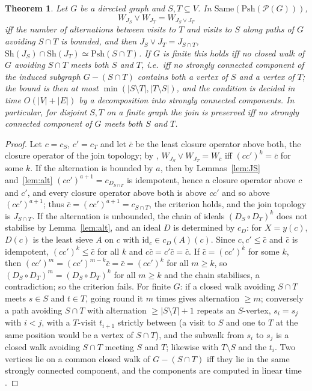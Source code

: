 \documentclass[11pt]{amsart}
\newtheorem{thm}{Theorem}[section]
\theoremstyle{definition}
\newcommand{\Same}{\mathrm{Same}}
\newcommand{\Psh}{\mathrm{Psh}}
\newcommand{\Sh}{\mathrm{Sh}}
\newcommand{\cP}{\mathcal P}
\begin{document}
\begin{thm}\label{thm:cut}
Let $G$ be a directed graph and $S,T\subseteq V$. In
$\Same(\Psh(\cP(G)))$,
\[
W_{J_S}\vee W_{J_T}=W_{J_S\vee J_T}
\]
iff the number of alternations between visits to $T$ and visits to $S$
along paths of $G$ avoiding $S\cap T$ is bounded, and then $J_S\vee
J_T=J_{S\cap T}$, $\Sh(J_S)\cap\Sh(J_T)\simeq\Psh(S\cap T)$. If $G$ is
finite this holds iff no closed walk of $G$ avoiding $S\cap T$ meets both
$S$ and $T$, i.e.\ iff no strongly connected component of the induced
subgraph $G-(S\cap T)$ contains both a vertex of $S$ and a vertex of $T$;
the bound is then at most $\min(|S\setminus T|,|T\setminus S|)$, and the
condition is decided in time $O(|V|+|E|)$ by a decomposition into strongly
connected components. In particular, for disjoint $S,T$ on a finite graph
the join is preserved iff no strongly connected component of $G$ meets both
$S$ and $T$.
\end{thm}
\begin{proof}
Let $c=c_S$, $c'=c_T$ and let $\bar c$ be the least closure operator
above both, the closure operator of the join topology; by
\cite[Thm.~B]{Fijoin}, $W_{J_S}\vee W_{J_T}=W_{\bar c}$ iff $(cc')^k=\bar c$
for some $k$. If the alternation is bounded by $a$, then by
Lemmas~\ref{lem:JS} and~\ref{lem:alt} $(cc')^{a+1}=c_{D_{S\cap T}}$ is
idempotent, hence a closure operator above $c$ and $c'$, and every closure
operator above both is above $cc'$ and so above $(cc')^{a+1}$; thus $\bar
c=(cc')^{a+1}=c_{S\cap T}$, the criterion holds, and the join topology is
$J_{S\cap T}$. If the alternation is unbounded, the chain of ideals
$(D_S\circ D_T)^k$ does not stabilise by Lemma~\ref{lem:alt}, and an ideal
$D$ is determined by $c_D$: for $X=y(c)$, $D(c)$ is the least sieve $A$ on
$c$ with $\mathrm{id}_c\in c_D(A)(c)$. Since $c,c'\le\bar c$ and $\bar c$ is
idempotent, $(cc')^k\le\bar c$ for all $k$ and $c\bar c=c'\bar c=\bar c$.
If $\bar c=(cc')^k$ for some $k$, then $(cc')^m=(cc')^{m-k}\bar c=\bar
c=(cc')^k$ for all $m\ge k$, so $(D_S\circ D_T)^m=(D_S\circ D_T)^k$ for all
$m\ge k$ and the chain stabilises, a contradiction; so the criterion fails.
For finite $G$: if a closed walk avoiding $S\cap T$ meets $s\in S$ and
$t\in T$, going round it $m$ times gives alternation $\ge m$; conversely a
path avoiding $S\cap T$ with alternation $\ge|S\setminus T|+1$ repeats an
$S$-vertex, $s_i=s_j$ with $i<j$, with a $T$-visit $t_{i+1}$ strictly
between (a visit to $S$ and one to $T$ at the same position would be a
vertex of $S\cap T$), and the subwalk from $s_i$ to $s_j$ is a closed walk
avoiding $S\cap T$ meeting $S$ and $T$; likewise with $T\setminus S$ and
the $t_i$. Two vertices lie on a common closed walk of $G-(S\cap T)$ iff
they lie in the same strongly connected component, and the components are
computed in linear time \cite{Tarjan}.
\end{proof}
\end{document}
